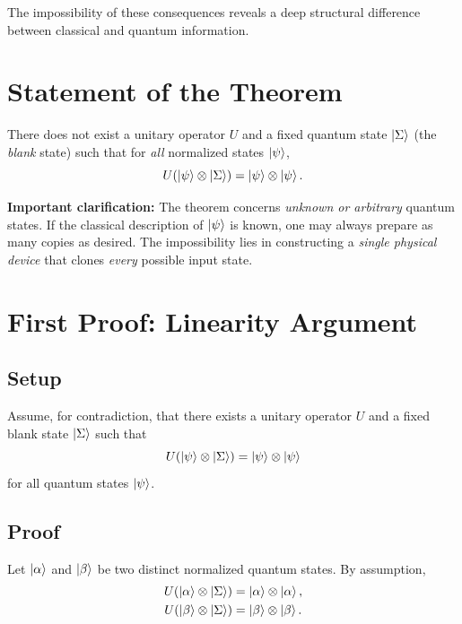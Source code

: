 \documentclass[12pt]{article}
\newcommand{\tensor}{\otimes}
\begin{document}
The impossibility of these consequences reveals a deep structural difference between classical and quantum information.

\section{Statement of the Theorem}

\begin{tcolorbox}[title=No-Cloning Theorem]
There does not exist a unitary operator $U$ and a fixed quantum state $\ket{\Sigma}$ (the \emph{blank} state) such that for \emph{all} normalized states $\ket{\psi}$,
\[
U(\ket{\psi} \tensor \ket{\Sigma}) = \ket{\psi} \tensor \ket{\psi}.
\]
\end{tcolorbox}

\textbf{Important clarification:}  
The theorem concerns \emph{unknown or arbitrary} quantum states. If the classical description of $\ket{\psi}$ is known, one may always prepare as many copies as desired. The impossibility lies in constructing a \emph{single physical device} that clones \emph{every} possible input state.

\section{First Proof: Linearity Argument}

\subsection{Setup}

Assume, for contradiction, that there exists a unitary operator $U$ and a fixed blank state $\ket{\Sigma}$ such that
\begin{equation}
U(\ket{\psi} \tensor \ket{\Sigma}) = \ket{\psi} \tensor \ket{\psi}
\label{eq:clone}
\end{equation}
for all quantum states $\ket{\psi}$.

\subsection{Proof}

Let $\ket{\alpha}$ and $\ket{\beta}$ be two distinct normalized quantum states. By assumption,
\begin{align}
U(\ket{\alpha} \tensor \ket{\Sigma}) &= \ket{\alpha} \tensor \ket{\alpha}, \label{eq:clonealpha}\\
U(\ket{\beta} \tensor \ket{\Sigma}) &= \ket{\beta} \tensor \ket{\beta}. \label{eq:clonebeta}
\end{align}
\end{document}
